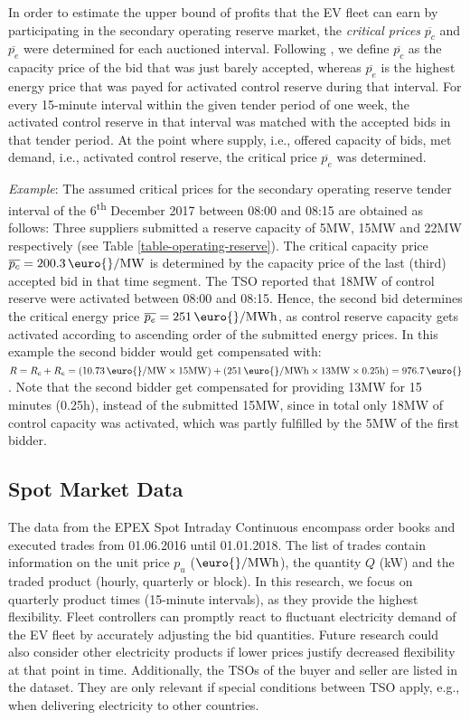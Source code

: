 \documentclass[a4paper, 12pt]{article}
\let\textcite\shortciteA
\begin{document}
In order to estimate the upper bound of profits that the EV fleet can earn by
participating in the secondary operating reserve market, the \emph{critical prices}
\(\overline{p_c}\) and \(\overline{p_e}\) were determined for each auctioned
interval. Following \textcite{brandt17_evaluat_busin_model_vehic_grid_integ}, we
define \(\overline{p_c}\) as the capacity price of the bid that was just barely
accepted, whereas \(\overline{p_e}\) is the highest energy price that was payed
for activated control reserve during that interval. For every
15-minute interval within the given tender period of one week, the activated
control reserve in that interval was matched with the accepted bids in that
tender period. At the point where supply, i.e., offered capacity of bids, met
demand, i.e., activated control reserve, the critical price \(\overline{p_e}\) was
determined.

\emph{Example}: The assumed critical prices for the secondary operating reserve
tender interval of the 6\textsuperscript{th} December 2017 between 08:00 and 08:15 are obtained
as follows: Three suppliers submitted a reserve capacity of 5MW, 15MW and 22MW
respectively (see Table \ref{table-operating-reserve}). The critical capacity
price \(\overline{p_c} = 200.3 \text{ \!\euro{}/MW}\) is determined by the
capacity price of the last (third) accepted bid in that time segment. The TSO
reported that 18MW of control reserve were activated between 08:00 and 08:15.
Hence, the second bid determines the critical energy price \(\overline{p_e} = 251
\text{ \!\euro{}/MWh}\), as control reserve capacity gets activated according to
ascending order of the submitted energy prices. In this example the second
bidder would get compensated with: \(R = R_c + R_e =(10.73
\text{ \!\euro{}/MW}\times15\text{MW}) + (251
\text{ \!\euro{}/MWh}\times13\text{MW}\times 0.25\text{h}) =
976.7\text{ \!\euro{}}\). Note that the second bidder get compensated for
providing 13MW for 15 minutes (0.25h), instead of the submitted 15MW, since in
total only 18MW of control capacity was activated, which was partly fulfilled
by the 5MW of the first bidder.

\subsection{Spot Market Data}
\label{sec:org904c6ba}
The data from the EPEX Spot Intraday Continuous encompass order books and
executed trades from 01.06.2016 until 01.01.2018. The list of trades contain
information on the unit price \(p_u\) (\(\text{\euro{}/MWh}\)), the quantity \(Q\)
(kW) and the traded product (hourly, quarterly or block). In this research, we
focus on quarterly product times (15-minute intervals), as they provide the
highest flexibility. Fleet controllers can promptly react to fluctuant
electricity demand of the EV fleet by accurately adjusting the bid quantities.
Future research could also consider other electricity products if lower prices
justify decreased flexibility at that point in time. Additionally, the TSOs of
the buyer and seller are listed in the dataset. They are only relevant if
special conditions between TSO apply, e.g., when delivering electricity to other
countries.
\end{document}
